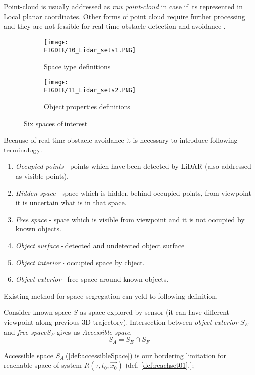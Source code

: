 Point-cloud is usually addressed as \textit{raw point-cloud} in case if its represented in Local planar coordinates. Other forms of point cloud require further processing and they are not feasible for real time obstacle detection and avoidance \cite{chen2007airborne}.

\begin{figure}[H]
    \begin{subfigure}{0.5\textwidth}
    \texttt{[image: \\FIGDIR/10\_Lidar\_sets1.PNG]} 
    \caption{Space type definitions}
    \label{fig:Spacetypes}
    \end{subfigure}
    \begin{subfigure}{0.5\textwidth}
    \texttt{[image: \\FIGDIR/11\_Lidar\_sets2.PNG]}
    \caption{Object properties definitions}
    \label{fig:ObectProperties}
    \end{subfigure}
    \caption{Six spaces of interest \cite{yapo2008probabilistic}}
    \label{fig:Spaces of interests}
 \end{figure}
 
\noindent  Because of real-time obstacle avoidance it is necessary to introduce following terminology:
 \begin{enumerate}
 \item \textit{Occupied points} - points which have been detected by LiDAR (also addressed as visible points).
 \item \textit{Hidden space} - space which is hidden behind occupied points, from viewpoint it is uncertain what is in that space. 
 \item \textit{Free space} - space which is visible from viewpoint and it is not occupied by known objects.
 \item \textit{Object surface} - detected and undetected object surface
 \item \textit{Object interior} - occupied space by object.
 \item \textit{Object exterior} - free space around known objects.
 \end{enumerate}
 Existing method for space segregation \cite{yapo2008probabilistic} can yeld to following definition.
 \begin{definition}\label{def:accessibleSpace}
    Consider known space $S$ as space explored by sensor (it can have different viewpoint along previous 3D trajectory).
    Intersection between \textit{object exterior} $S_E$ and \textit{free space}$S_F$ gives us \textit{Accessible space}.
    \begin{equation}
        S_A = S_E \cap S_F
    \end{equation}
 \end{definition}
 
 \noindent Accessible space $S_A$ (\ref{def:accessibleSpace}) is our bordering limitation for reachable space of system $R(\tau,t_0,\vec{x_0})$ (def. \ref{def:reachset01}.); 